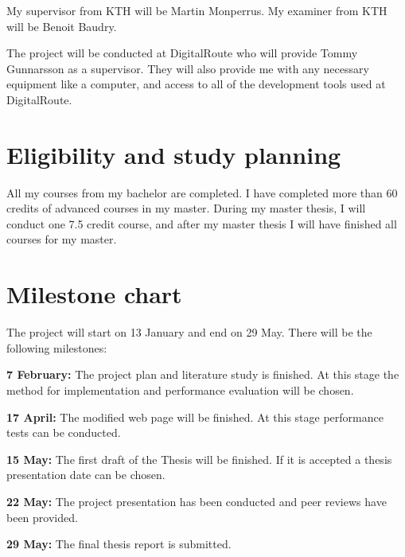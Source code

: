 My supervisor from KTH will be Martin Monperrus. My examiner from KTH will be Benoit Baudry.

The project will be conducted at DigitalRoute who will provide Tommy Gunnarsson as a supervisor. They will also provide me with any necessary equipment like a computer, and access to all of the development tools used at DigitalRoute.

\section{Eligibility and study planning}

All my courses from my bachelor are completed. I have completed more than 60 credits of advanced courses in my master. During my master thesis, I will conduct one 7.5 credit course, and after my master thesis I will have finished all courses for my master.

\section{Milestone chart}

The project will start on 13 January and end on 29 May. There will be the following milestones:

\textbf{7 February:} The project plan and literature study is finished. At this stage the method for implementation and performance evaluation will be chosen.

\textbf{17 April:} The modified web page will be finished. At this stage performance tests can be conducted.

\textbf{15 May:} The first draft of the Thesis will be finished. If it is accepted a thesis presentation date can be chosen.

\textbf{22 May:} The project presentation has been conducted and peer reviews have been provided.

\textbf{29 May:} The final thesis report is submitted.
